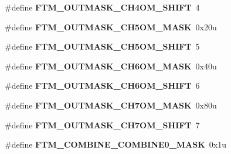 \begin{DoxyCompactItemize}
\item 
\#define {\bfseries F\+T\+M\+\_\+\+O\+U\+T\+M\+A\+S\+K\+\_\+\+C\+H4\+O\+M\+\_\+\+S\+H\+I\+FT}~4\hypertarget{group__FTM__Register__Masks_gacb820bca5f610439c9259fcbf80a75d8}{}\label{group__FTM__Register__Masks_gacb820bca5f610439c9259fcbf80a75d8}

\item 
\#define {\bfseries F\+T\+M\+\_\+\+O\+U\+T\+M\+A\+S\+K\+\_\+\+C\+H5\+O\+M\+\_\+\+M\+A\+SK}~0x20u\hypertarget{group__FTM__Register__Masks_ga36491b140fef946f30510e8028487986}{}\label{group__FTM__Register__Masks_ga36491b140fef946f30510e8028487986}

\item 
\#define {\bfseries F\+T\+M\+\_\+\+O\+U\+T\+M\+A\+S\+K\+\_\+\+C\+H5\+O\+M\+\_\+\+S\+H\+I\+FT}~5\hypertarget{group__FTM__Register__Masks_ga788fa594e321e3c5ae5b0dea445caf4c}{}\label{group__FTM__Register__Masks_ga788fa594e321e3c5ae5b0dea445caf4c}

\item 
\#define {\bfseries F\+T\+M\+\_\+\+O\+U\+T\+M\+A\+S\+K\+\_\+\+C\+H6\+O\+M\+\_\+\+M\+A\+SK}~0x40u\hypertarget{group__FTM__Register__Masks_ga015da8c828efae7c503a3a1d87c9007a}{}\label{group__FTM__Register__Masks_ga015da8c828efae7c503a3a1d87c9007a}

\item 
\#define {\bfseries F\+T\+M\+\_\+\+O\+U\+T\+M\+A\+S\+K\+\_\+\+C\+H6\+O\+M\+\_\+\+S\+H\+I\+FT}~6\hypertarget{group__FTM__Register__Masks_ga6c7e53365e176cea807c9d68ce0fb6ad}{}\label{group__FTM__Register__Masks_ga6c7e53365e176cea807c9d68ce0fb6ad}

\item 
\#define {\bfseries F\+T\+M\+\_\+\+O\+U\+T\+M\+A\+S\+K\+\_\+\+C\+H7\+O\+M\+\_\+\+M\+A\+SK}~0x80u\hypertarget{group__FTM__Register__Masks_gadf061026503672ed642b2d2f599afb98}{}\label{group__FTM__Register__Masks_gadf061026503672ed642b2d2f599afb98}

\item 
\#define {\bfseries F\+T\+M\+\_\+\+O\+U\+T\+M\+A\+S\+K\+\_\+\+C\+H7\+O\+M\+\_\+\+S\+H\+I\+FT}~7\hypertarget{group__FTM__Register__Masks_gae1b4dc666609c954526cc0f83bf18ce3}{}\label{group__FTM__Register__Masks_gae1b4dc666609c954526cc0f83bf18ce3}

\item 
\#define {\bfseries F\+T\+M\+\_\+\+C\+O\+M\+B\+I\+N\+E\+\_\+\+C\+O\+M\+B\+I\+N\+E0\+\_\+\+M\+A\+SK}~0x1u\hypertarget{group__FTM__Register__Masks_gaf48cb997d418c07e063179fa8459c75a}{}\label{group__FTM__Register__Masks_gaf48cb997d418c07e063179fa8459c75a}


\end{DoxyCompactItemize}
